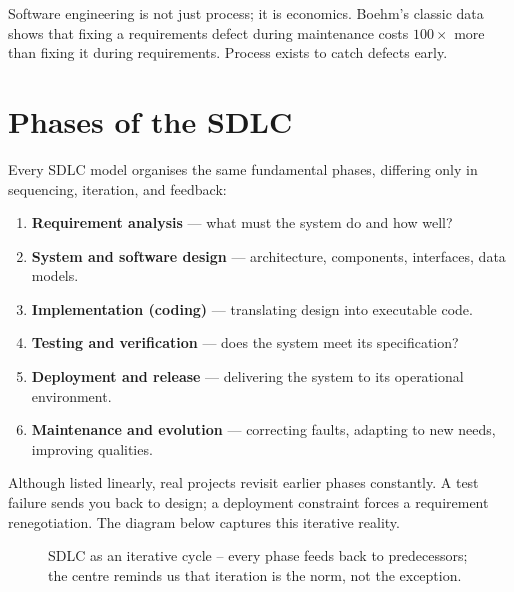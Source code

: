 Software engineering is not just process; it is economics. Boehm's classic data shows that fixing a requirements defect during maintenance costs $100\times$ more than fixing it during requirements. Process exists to catch defects early.

\section{Phases of the SDLC}

Every SDLC model organises the same fundamental phases, differing only in sequencing, iteration, and feedback:

\begin{enumerate}
    \item \textbf{Requirement analysis} --- what must the system do and how well?
    \item \textbf{System and software design} --- architecture, components, interfaces, data models.
    \item \textbf{Implementation (coding)} --- translating design into executable code.
    \item \textbf{Testing and verification} --- does the system meet its specification?
    \item \textbf{Deployment and release} --- delivering the system to its operational environment.
    \item \textbf{Maintenance and evolution} --- correcting faults, adapting to new needs, improving qualities.
\end{enumerate}

Although listed linearly, real projects revisit earlier phases constantly. A test failure sends you back to design; a deployment constraint forces a requirement renegotiation. The diagram below captures this iterative reality.

\begin{figure}[h]
\centering
{}
\caption{SDLC as an iterative cycle -- every phase feeds back to predecessors; the centre reminds us that iteration is the norm, not the exception.}
\end{figure}


